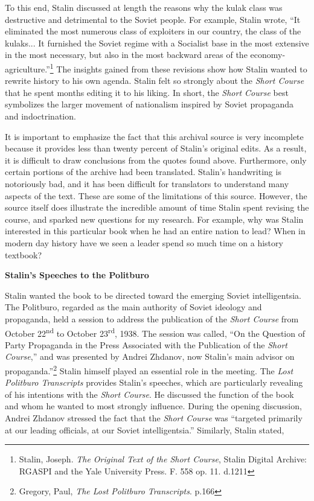 \documentclass[a4paper, twocolumn]{article}
\begin{document}
	To this end, Stalin discussed at length the reasons why the kulak
    class was destructive and detrimental to the Soviet people. For
    example, Stalin wrote, ``It eliminated the most numerous class of
    exploiters in our country, the class of the kulaks... It furnished
    the Soviet regime with a Socialist base in the most extensive in
    the most necessary, but also in the most backward areas of the
    economy- agriculture.''\footnote{Stalin, Joseph. \emph{The Original Text of the Short Course}, Stalin Digital Archive: RGASPI and the Yale University Press.  F. 558 op. 11. d.1211} The insights gained from these revisions
    show how Stalin wanted to rewrite history to his own
    agenda. Stalin felt so strongly about the \emph{Short Course} that he
    spent months editing it to his liking. In short, the \emph{Short Course}
    best symbolizes the larger movement of nationalism inspired by
    Soviet propaganda and indoctrination.

It is important to emphasize the fact that this archival source is
very incomplete because it provides less than twenty percent of
Stalin's original edits. As a result, it is difficult to draw
conclusions from the quotes found above. Furthermore, only certain
portions of the archive had been translated. Stalin's handwriting is
notoriously bad, and it has been difficult for translators to
understand many aspects of the text. These are some of the limitations
of this source. However, the source itself does illustrate the
incredible amount of time Stalin spent revising the course, and
sparked new questions for my research. For example, why was Stalin
interested in this particular book when he had an entire nation to
lead? When in modern day history have we seen a leader spend so much
time on a history textbook?


\begin{center}\textbf{Stalin's Speeches to the Politburo}\end{center}

Stalin wanted the book to be directed toward the emerging Soviet
intelligentsia. The Politburo, regarded as the main authority of
Soviet ideology and propaganda, held a session to address the
publication of the \emph{Short Course} from October 22\textsuperscript{nd} to October 23\textsuperscript{rd},
1938. The session was called, ``On the Question of Party Propaganda in
the Press Associated with the Publication of the \emph{Short Course},” and
was presented by Andrei Zhdanov, now Stalin's main advisor on
propaganda.''\footnote{Gregory, Paul, \emph{The Lost Politburo Transcripts}. p.166} Stalin himself played an essential role in the
meeting. The \emph{Lost Politburo Transcripts} provides Stalin's speeches,
which are particularly revealing of his intentions with the \emph{Short
Course}. He discussed the function of the book and whom he wanted to
most strongly influence. During the opening discussion, Andrei Zhdanov
stressed the fact that the \emph{Short Course} was ``targeted primarily at our
leading officials, at our Soviet intelligentsia.'' Similarly, Stalin
stated,
\end{document}
